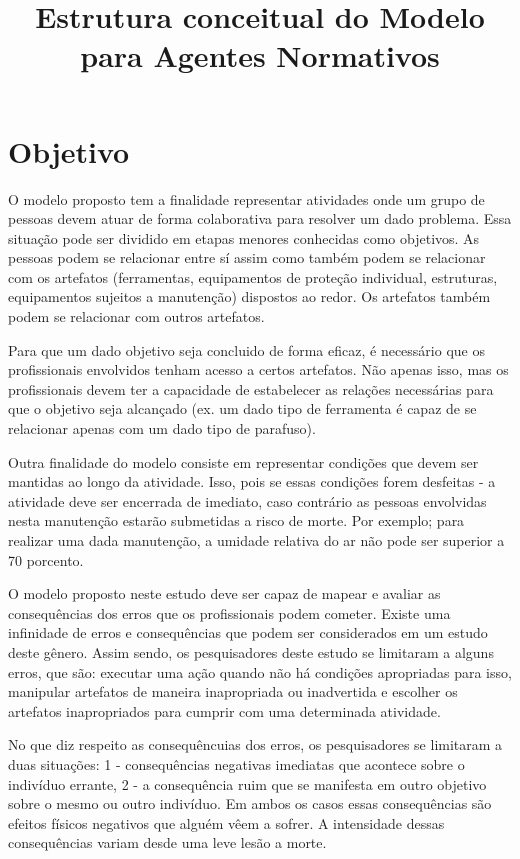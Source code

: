 \documentclass[12pt]{article}
\title{Estrutura conceitual do Modelo para Agentes Normativos}
\begin{document}
 

\section{Objetivo}

O modelo proposto tem a finalidade representar atividades onde um grupo de pessoas devem atuar de forma colaborativa para resolver um dado problema. Essa situação pode ser dividido em etapas menores conhecidas como objetivos. As pessoas podem se relacionar entre sí assim como também podem se relacionar com os artefatos (ferramentas, equipamentos de proteção individual, estruturas, equipamentos sujeitos a manutenção) dispostos ao redor. Os artefatos também podem se relacionar com outros artefatos.

Para que um dado objetivo seja concluido de forma eficaz, é necessário que os profissionais envolvidos tenham acesso a certos artefatos. Não apenas isso, mas os profissionais devem ter a capacidade de estabelecer as relações necessárias para que o objetivo seja alcançado (ex. um dado tipo de ferramenta é capaz de se relacionar apenas com um dado tipo de parafuso).  

Outra finalidade do modelo consiste em representar condições que devem ser mantidas ao longo da atividade. Isso, pois se essas condições forem desfeitas - a atividade deve ser encerrada de imediato, caso contrário as pessoas envolvidas nesta manutenção estarão submetidas a risco de morte. Por exemplo; para realizar uma dada manutenção, a umidade relativa do ar não pode ser superior a 70 porcento. 

O modelo proposto neste estudo deve ser capaz de mapear e avaliar as consequências dos erros que os profissionais podem cometer. Existe uma infinidade de erros e consequências que podem ser considerados em um estudo deste gênero. Assim sendo, os pesquisadores deste estudo se limitaram a alguns erros, que são: executar uma ação quando não há condições apropriadas para isso, manipular artefatos de maneira inapropriada ou inadvertida e escolher os artefatos inapropriados para cumprir com uma determinada atividade.

No que diz respeito as consequêncuias dos erros, os pesquisadores se limitaram a duas situações: 1 - consequências negativas imediatas que acontece sobre o indivíduo errante, 2 - a consequência ruim que se manifesta em outro objetivo sobre o mesmo ou outro indivíduo. Em ambos os casos essas consequências são efeitos físicos negativos que alguém vêem a sofrer. A intensidade dessas consequências variam desde uma leve lesão a morte.
\end{document}
